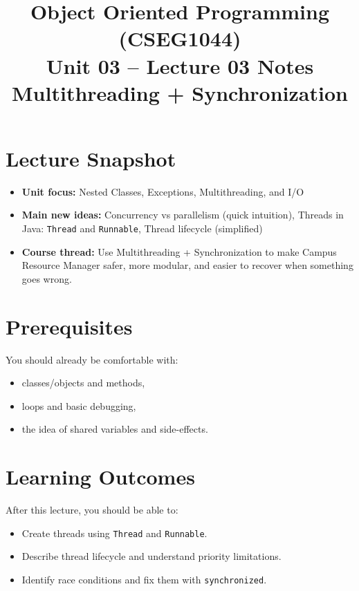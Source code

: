 \documentclass[11pt]{article}
\title{Object Oriented Programming (CSEG1044)\\Unit 03 -- Lecture 03 Notes\\Multithreading + Synchronization}
\begin{document}
\maketitle
\tableofcontents

\section{Lecture Snapshot}
\begin{itemize}
  \item \textbf{Unit focus:} Nested Classes, Exceptions, Multithreading, and I/O
  \item \textbf{Main new ideas:} Concurrency vs parallelism (quick intuition), Threads in Java: \texttt{Thread} and \texttt{Runnable}, Thread lifecycle (simplified)
  \item \textbf{Course thread:} Use Multithreading + Synchronization to make Campus Resource Manager safer, more modular, and easier to recover when something goes wrong.
\end{itemize}
\notesources{\OOPSUnitIIISources}

\section{Prerequisites}
You should already be comfortable with:
\begin{itemize}
  \item classes/objects and methods,
  \item loops and basic debugging,
  \item the idea of shared variables and side-effects.
\end{itemize}

\section{Learning Outcomes}
After this lecture, you should be able to:
\begin{itemize}
  \item Create threads using \texttt{Thread} and \texttt{Runnable}.
  \item Describe thread lifecycle and understand priority limitations.
  \item Identify race conditions and fix them with \texttt{synchronized}.
\end{itemize}
\end{document}
